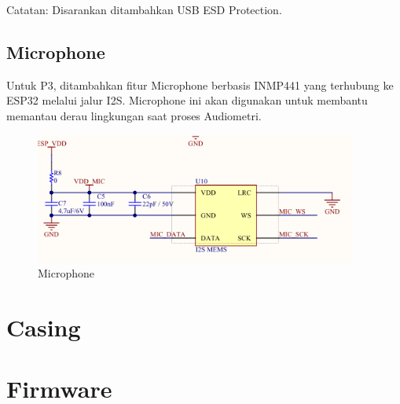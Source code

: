 \documentclass{book} %
\begin{document}
	Catatan: Disarankan ditambahkan USB ESD Protection.
    
    \newpage
    \section{Microphone}
    
    Untuk P3, ditambahkan fitur Microphone berbasis INMP441 yang terhubung ke ESP32 melalui jalur I2S.
    Microphone ini akan digunakan untuk membantu memantau derau lingkungan saat proses Audiometri.
    
    \begin{figure}[!ht]
    	\centering
    	\includegraphics[width=300pt]{images/p3_mic}
    	\caption{Microphone}
    \end{figure}
    
    \chapter{Casing}
    
    \chapter{Firmware}
\end{document}
